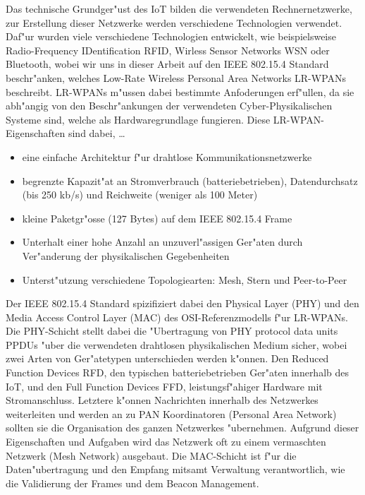 \documentclass[final]{lktseminar}
\begin{document}
Das technische Grundger"ust des IoT bilden die verwendeten Rechnernetzwerke, zur Erstellung dieser Netzwerke
werden verschiedene Technologien verwendet. Daf"ur wurden viele verschiedene Technologien entwickelt, wie beispielsweise
 Radio-Frequency IDentification RFID, Wirless Sensor Networks WSN oder Bluetooth, wobei wir uns in dieser
 Arbeit auf den IEEE 802.15.4 Standard beschr"anken, welches Low-Rate Wireless Personal Area Networks LR-WPANs beschreibt.
 LR-WPANs m"ussen dabei bestimmte Anfoderungen erf"ullen, da sie abh"angig von den Beschr"ankungen der verwendeten
 Cyber-Physikalischen Systeme sind, welche als Hardwaregrundlage fungieren. Diese LR-WPAN-Eigenschaften sind dabei, \dots
\begin{itemize}
    \item eine einfache Architektur f"ur drahtlose Kommunikationsnetzwerke
    \item begrenzte Kapazit"at an Stromverbrauch (batteriebetrieben), Datendurchsatz (bis 250 kb/s) und Reichweite (weniger als 100 Meter)
    \item kleine Paketgr"osse (127 Bytes) auf dem IEEE 802.15.4 Frame
    \item Unterhalt einer hohe Anzahl an unzuverl"assigen Ger"aten durch Ver"anderung der physikalischen Gegebenheiten
    \item Unterst"utzung verschiedene Topologiearten: Mesh, Stern und Peer-to-Peer
\end{itemize}

Der IEEE 802.15.4 Standard spizifiziert dabei den Physical Layer (PHY) und den Media Access Control Layer (MAC) des
OSI-Referenzmodells f"ur LR-WPANs.
Die PHY-Schicht stellt dabei die "Ubertragung von PHY protocol data units PPDUs "uber die verwendeten drahtlosen physikalischen Medium sicher,
wobei zwei Arten von Ger"atetypen unterschieden werden k"onnen. Den Reduced Function Devices RFD, den typischen batteriebetrieben Ger"aten
innerhalb des IoT, und den Full Function Devices FFD, leistungsf"ahiger Hardware mit Stromanschluss. Letztere k"onnen Nachrichten innerhalb des
Netzwerkes weiterleiten und werden an zu PAN Koordinatoren (Personal Area Network) sollten sie die Organisation des ganzen Netzwerkes
"ubernehmen. Aufgrund dieser Eigenschaften und Aufgaben wird das Netzwerk oft zu einem vermaschten Netzwerk (Mesh Network) ausgebaut.
Die MAC-Schicht ist f"ur die Daten"ubertragung und den Empfang mitsamt Verwaltung verantwortlich, wie die Validierung der Frames und dem
Beacon Management.
\end{document}
